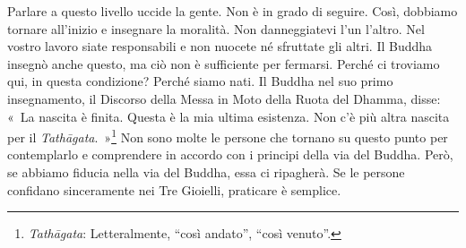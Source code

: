 Parlare a questo livello uccide la gente. Non è in grado di seguire.
Così, dobbiamo tornare all'inizio e insegnare la moralità. Non
danneggiatevi l'un l'altro. Nel vostro lavoro siate responsabili e non
nuocete né sfruttate gli altri. Il Buddha insegnò anche questo, ma ciò
non è sufficiente per fermarsi. Perché ci troviamo qui, in questa
condizione? Perché siamo nati. Il Buddha nel suo primo insegnamento, il
Discorso della Messa in Moto della Ruota del Dhamma, disse: «~La nascita
è finita. Questa è la mia ultima esistenza. Non c'è più altra nascita
per il \emph{Tathāgata}.~»\footnote{\emph{Tathāgata}: Letteralmente,
  ``così andato'', ``così venuto''.} Non sono molte le persone che
tornano su questo punto per contemplarlo e comprendere in accordo con i
principi della via del Buddha. Però, se abbiamo fiducia nella via del
Buddha, essa ci ripagherà. Se le persone confidano sinceramente nei Tre
Gioielli, praticare è semplice.

